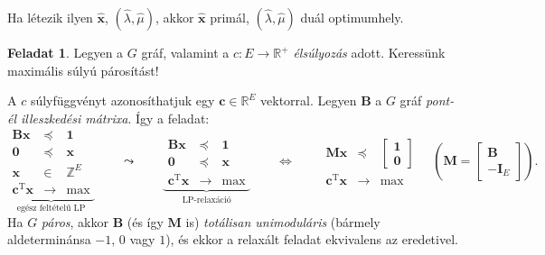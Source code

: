 \documentclass[%
	DIV=15,appendixprefix]{scrreprt}
\theoremstyle{definition}
\newtheorem*{feladat}{Feladat}
\theoremstyle{remark}
\DeclareMathOperator{\T}{T}
\begin{document}
Ha létezik ilyen $ \hat{ \mathbf{ x } } $, $ \left( \hat{ \lambda } ,{} \hat{ \mu } \right) $, akkor $ \hat{ \mathbf{ x } } $ primál, $ \left( \hat{ \lambda } ,{} \hat{ \mu } \right) $ duál optimumhely.
%
\begin{feladat}
	Legyen a $ G $ gráf, valamint a $ c \colon E \rightarrow \mathbb{ R }^{ + } $ \emph{élsúlyozás}
	adott. Keressünk maximális súlyú párosítást!
\end{feladat}
A $ c $ súlyfüggvényt azonosíthatjuk egy $ \mathbf{ c } \in \mathbb{ R }^{ E } $ vektorral. Legyen
$ \mathbf{ B } $ a $ G $ gráf \emph{pont-él illeszkedési mátrixa}. Így a feladat:
\begin{equation*}
	\underbrace{\begin{array}{rcl}
		\mathbf{ B } \mathbf{ x }			&	\preceq	&	\mathbf{ 1 }\\
		\mathbf{ 0 }						&	\preceq	&	\mathbf{ x }\\
		\mathbf{ x }						&	\in		&	\mathbb{ Z }^{ E }\\
		\hline
		\mathbf{ c }^{ \T } \mathbf{ x }	&	\rightarrow	&	\max
	\end{array}}_{\text{egész feltételű LP}} \qquad \leadsto \qquad \underbrace{\begin{array}{rcl}
		\mathbf{ B } \mathbf{ x }			&	\preceq	&	\mathbf{ 1 }\\
		\mathbf{ 0 }						&	\preceq	&	\mathbf{ x }\\
		\hline
		\mathbf{ c }^{ \T } \mathbf{ x }	&	\rightarrow	&	\max
	\end{array}}_{\text{LP-relaxáció}} \qquad \Leftrightarrow \qquad \begin{array}{rcl}
		\mathbf{ M } \mathbf{ x }			&	\preceq	&	\begin{bmatrix}
				\mathbf{ 1 }\\
				\mathbf{ 0 }
			\end{bmatrix}\\
		\hline
		\mathbf{ c }^{ \T } \mathbf{ x }	&	\rightarrow	&	\max
	\end{array} \quad \left( \mathbf{ M } = \begin{bmatrix}
		\mathbf{ B }\\
		- \mathbf{ I }_{ E }
	\end{bmatrix} \right) .
\end{equation*}
Ha $ G $ \emph{páros}, akkor $ \mathbf{ B } $ (és így $ \mathbf{ M } $ is) \emph{totálisan
unimoduláris} (bármely aldeterminánsa $ - 1 $, $ 0 $ vagy $ 1 $), és ekkor a relaxált feladat
ekvivalens az eredetivel.
\end{document}
